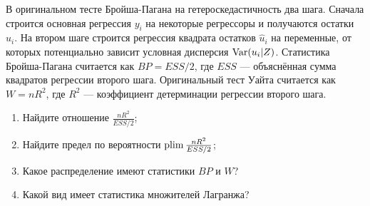 \begin{problem}
В оригинальном тесте Бройша-Пагана на гетероскедастичность два шага. Сначала строится основная регрессия $y_i$ на некоторые регрессоры и получаются остатки $\hat u_i$. На втором шаге строится регрессия квадрата остатков $\hat u_i$ на переменные, от которых потенциально зависит условная дисперсия $\operatorname{Var}(u_i|Z)$. Статистика Бройша-Пагана считается как $BP=ESS/2$, где $ESS$ — объяснённая сумма квадратов регрессии второго шага. Оригинальный тест Уайта считается как $W=nR^2$, где $R^2$ — коэффициент детерминации регрессии второго шага.
\begin{enumerate}
  \item Найдите отношение $\frac{nR^2}{ESS/2}$;
  \item Найдите предел по вероятности $\operatorname*{plim} \frac{nR^2}{ESS/2}$;
  \item Какое распределение имеют статистики $BP$ и $W$?
  \item Какой вид имеет статистика множителей Лагранжа?
\end{enumerate}


\begin{sol}

  \end{sol}
\end{problem}







